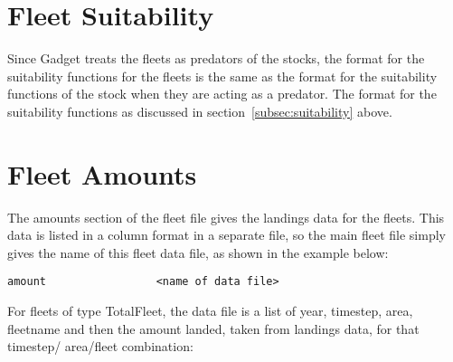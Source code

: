 \documentclass [a4paper, 10pt]{book}
\begin{document}


\section{Fleet Suitability}\label{sec:fleetsuit}
Since Gadget treats the fleets as predators of the stocks, the format for the suitability functions for the fleets is the same as the format for the suitability functions of the stock when they are acting as a predator.  The format for the suitability functions as discussed in section~\ref{subsec:suitability} above.


\section{Fleet Amounts}\label{sec:fleetamount}
The amounts section of the fleet file gives the landings data for the fleets.  This data is listed in a column format in a separate file, so the main fleet file simply gives the name of this fleet data file, as shown in the example below:

{\small\begin{verbatim}
amount                 <name of data file>
\end{verbatim}}

For fleets of type TotalFleet, the data file is a list of year, timestep, area, fleetname and then the amount landed, taken from landings data, for that timestep/ area/fleet combination:
\end{document}
